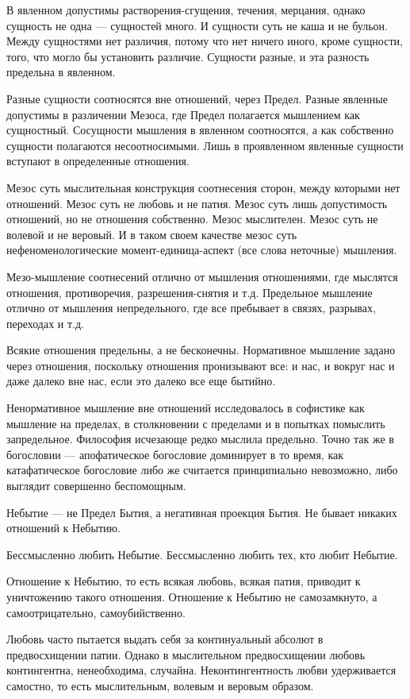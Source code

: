 В явленном допустимы растворения-сгущения, течения, мерцания, однако сущность
не одна — сущностей много. И сущности суть не каша и не бульон. Между
сущностями нет различия, потому что нет ничего иного, кроме сущности, того, что
могло бы установить различие. Сущности разные, и эта разность предельна в
явленном.

Разные сущности соотносятся вне отношений, через Предел. Разные явленные
допустимы в различении Мезоса, где Предел полагается мышлением как сущностный.
Сосущности мышления в явленном соотносятся, а как собственно сущности
полагаются несоотносимыми. Лишь в проявленном явленные сущности вступают в
определенные отношения.

Мезос суть мыслительная конструкция соотнесения сторон, между которыми нет
отношений. Мезос суть не любовь и не патия. Мезос суть лишь допустимость
отношений, но не отношения собственно. Мезос мыслителен. Мезос суть не волевой
и не веровый. И в таком своем качестве мезос суть нефеноменологические
момент-единица-аспект (все слова неточные) мышления.

Мезо-мышление соотнесений отлично от мышления отношениями, где мыслятся
отношения, противоречия, разрешения\hyp снятия и т.д. Предельное мышление отлично
от мышления непредельного, где все пребывает в связях, разрывах, переходах и
т.д.

Всякие отношения предельны, а не бесконечны. Нормативное мышление задано через
отношения, поскольку отношения пронизывают все: и нас, и вокруг нас и даже
далеко вне нас, если это далеко все еще бытийно.

Ненормативное мышление вне отношений исследовалось в софистике как мышление на
пределах, в столкновении с пределами и в попытках помыслить запредельное.
Философия исчезающе редко мыслила предельно. Точно так же в богословии —
апофатическое богословие доминирует в то время, как катафатическое богословие
либо же считается принципиально невозможно, либо выглядит совершенно
беспомощным.

Небытие — не Предел Бытия, а негативная проекция Бытия. Не бывает никаких
отношений к Небытию.

Бессмысленно любить Небытие. Бессмысленно любить тех, кто любит Небытие.

Отношение к Небытию, то есть всякая любовь, всякая патия, приводит к
уничтожению такого отношения. Отношение к Небытию не самозамкнуто, а
самоотрицательно, самоубийственно.

Любовь часто пытается выдать себя за континуальный абсолют в предвосхищении
патии. Однако в мыслительном предвосхищении любовь контингентна, ненеобходима,
случайна. Неконтингентность любви удерживается самостно, то есть мыслительным,
волевым и веровым образом.

